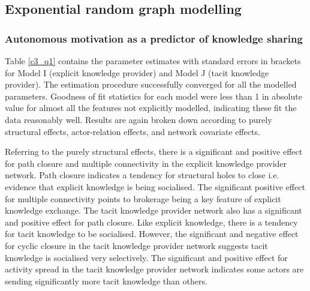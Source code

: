 \subsection{Exponential random graph modelling}

\subsubsection{Autonomous motivation as a predictor of knowledge sharing}

Table \ref{c3_q1} contains the parameter estimates with standard errors in brackets for Model I (explicit knowledge provider) and Model J (tacit knowledge provider). The estimation procedure successfully converged for all the modelled parameters. Goodness of fit statistics for each model were less than 1 in absolute value for almost all the features not explicitly modelled, indicating these fit the data reasonably well. Results are again broken down according to purely structural effects, actor-relation effects, and network covariate effects. \medskip

Referring to the purely structural effects, there is a significant and positive effect for path closure and multiple connectivity in the explicit knowledge provider network. Path closure indicates a tendency for structural holes to close i.e. evidence that explicit knowledge is being socialised. The significant positive effect for multiple connectivity points to brokerage being a key feature of explicit knowledge exchange. The tacit knowledge provider network also has a significant and positive effect for path closure. Like explicit knowledge, there is a tendency for tacit knowledge to be socialised. However, the significant and negative effect for cyclic closure in the tacit knowledge provider network suggests tacit knowledge is socialised very selectively. The significant and positive effect for activity spread in the tacit knowledge provider network indicates some actors are sending significantly more tacit knowledge than others.\medskip

